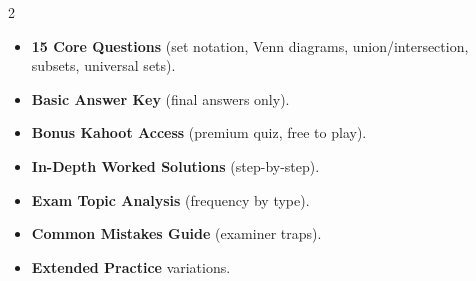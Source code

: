 \documentclass[11pt,a4paper]{article}
\newcommand{\FullReleaseDate}{April 30, 2026}
\begin{document}
\vspace{8pt}

\begin{multicols}{2}
  \begin{tcolorbox}[card, title=\sffamily\bfseries\textcolor{white}{\faHandPointDown\ TODAY (Simplified Version)}, colbacktitle=mainblue, boxed title style={sharp corners, boxrule=0pt}]
    \begin{itemize}[leftmargin=1.2em, itemsep=2pt]
      \item \small \textbf{15 Core Questions} (set notation, Venn diagrams, union/intersection, subsets, universal sets).
      \item \small \textbf{Basic Answer Key} (final answers only).
      \item \small \textbf{Bonus Kahoot Access} (premium quiz, free to play).
    \end{itemize}
  \end{tcolorbox}

  \columnbreak

  \begin{tcolorbox}[card, title=\sffamily\bfseries\textcolor{white}{\faRocket\ ON \FullReleaseDate\ (Full Upgrade)}, colbacktitle=mainblue, boxed title style={sharp corners, boxrule=0pt}]
    \begin{itemize}[leftmargin=1.2em, itemsep=2pt]
      \item \small \textbf{In-Depth Worked Solutions} (step-by-step).
      \item \small \textbf{Exam Topic Analysis} (frequency by type).
      \item \small \textbf{Common Mistakes Guide} (examiner traps).
      \item \small \textbf{Extended Practice} variations.
    \end{itemize}
  \end{tcolorbox}
\end{multicols}
\end{document}
